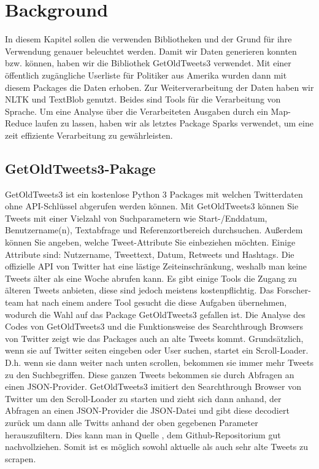 \section{Background}


	In diesem Kapitel sollen die verwenden Bibliotheken und der Grund für ihre Verwendung genauer beleuchtet werden. Damit wir Daten generieren konnten bzw. 
	können, haben wir die Bibliothek GetOldTweets3 verwendet. Mit einer öffentlich zugängliche Userliste für Politiker aus Amerika wurden dann mit diesem 
	Packages die Daten erhoben. Zur Weiterverarbeitung der Daten haben wir NLTK und TextBlob genutzt. Beides sind Tools für die Verarbeitung von Sprache. Um 
	eine Analyse über  die Verarbeiteten Ausgaben durch ein Map-Reduce laufen zu lassen, haben wir als letztes Package Sparks verwendet, um eine zeit 
	effiziente Verarbeitung zu gewährleisten.  
	
	 
	\subsection{GetOldTweets3-Pakage}
	
	GetOldTweets3 ist ein kostenlose Python 3 Packages mit welchen Twitterdaten ohne API-Schlüssel abgerufen werden können.
	Mit GetOldTweets3 können Sie Tweets mit einer Vielzahl von Suchparametern wie Start-/Enddatum, Benutzername(n), Textabfrage 
	und Referenzortbereich durchsuchen. Außerdem können Sie angeben, welche Tweet-Attribute Sie einbeziehen möchten. Einige Attribute
	sind: Nutzername, Tweettext, Datum, Retweets und Hashtags. 
	Die offizielle API von Twitter hat eine lästige Zeiteinschränkung, weshalb man keine Tweets älter als eine Woche abrufen 
	kann. Es gibt einige Tools die Zugang zu älteren Tweets anbieten, diese sind jedoch meistens kostenpflichtig. Das Forscher-
	team hat nach einem andere Tool gesucht die diese Aufgaben übernehmen, wodurch die Wahl auf das Package GetOldTweets3 gefallen 
	ist.   	
	Die Analyse des Codes von GetOldTweets3 und die Funktionsweise des Searchthrough Browsers von Twitter zeigt wie das Packages auch
	an alte Tweets kommt. Grundsätzlich, wenn sie auf Twitter seiten eingeben oder User suchen, startet ein Scroll-Loader. D.h. wenn sie
	dann weiter nach unten scrollen, bekommen sie immer mehr Tweets zu den Suchbegriffen. Diese ganzen Tweets bekommen sie durch Abfragen 
	an einen JSON-Provider. GetOldTweets3 imitiert den Searchthrough Browser von Twitter um den Scroll-Loader zu starten und zieht sich dann 
	anhand, der Abfragen an einen JSON-Provider die JSON-Datei und gibt diese decodiert zurück um dann alle Twitts anhand der oben gegebenen 
	Parameter herauszufiltern. Dies kann man in Quelle , dem Github-Repositorium gut nachvollziehen. Somit ist es möglich sowohl 
	aktuelle als auch sehr alte Tweets zu scrapen.
	
